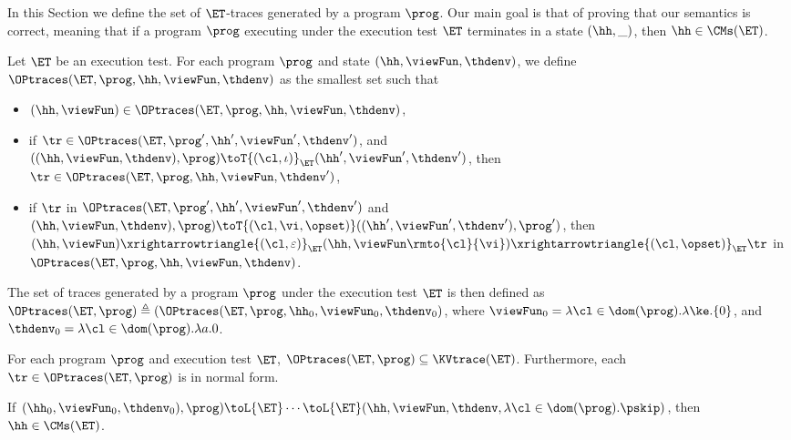 In this Section we define the set of $\ET$-traces generated by a program 
$\prog$. Our main goal is that of proving that our semantics is correct, 
meaning that if a program $\prog$ executing under the execution 
test $\ET$ terminates in a state $(\hh, \_)$, then $\hh \in \CMs(\ET)$. 

\begin{definition}
Let $\ET$ be an execution test. For each program $\prog$ and state 
$(\hh, \viewFun, \thdenv)$, we define $\OPtraces(\ET, \prog, \hh, \viewFun, \thdenv)$ 
as the smallest set such that 
\begin{itemize}
\item $(\hh, \viewFun) \in \OPtraces(\ET, \prog, \hh, \viewFun, \thdenv)$, 
\item if $\tr \in \OPtraces(\ET, \prog', \hh', \viewFun',\thdenv')$, 
and $((\hh, \viewFun, \thdenv) , \prog) \toT{(\cl, \iota)}_{\ET} (\hh', \viewFun', \thdenv')$, 
then $\tr \in \OPtraces(\ET, \prog, \hh, \viewFun, \thdenv')$, 
\item if $\tr$ in $\OPtraces(\ET, \prog', \hh', \viewFun', \thdenv')$ and 
\newline $(\hh, \viewFun, \thdenv), \prog) \toT{(\cl, \vi, \opset)} ((\hh', \viewFun', \thdenv'), \prog')$,  
then $(\hh, \viewFun) \xrightarrowtriangle{(\cl, \varepsilon)}_{\ET} (\hh, \viewFun\rmto{\cl}{\vi}) 
\xrightarrowtriangle{(\cl, \opset)}_{\ET} \tr$ in $\OPtraces(\ET, \prog, \hh, \viewFun, \thdenv)$. 
\end{itemize}

The set of traces generated by a program $\prog$ under the execution test $\ET$ is 
then defined as $\OPtraces(\ET, \prog) \triangleq (\OPtraces(\ET, \prog, \hh_{0}, \viewFun_{0}, 
\thdenv_{0})$, where $\viewFun_{0} = \lambda \cl \in \dom(\prog).\lambda \ke.\{0\}$, and 
$\thdenv_{0} = \lambda \cl \in \dom(\prog).\lambda a.0$.

\end{definition}

\begin{proposition}
For each program $\prog$ and execution test $\ET$, 
$\OPtraces(\ET, \prog) \subseteq \KVtrace(\ET)$. 
Furthermore, each $\tr \in \OPtraces(\ET, \prog)$ is in normal form. 
\end{proposition}

\begin{corollary}
If $(\hh_{0}, \viewFun_{0}, \thdenv_{0}), \prog) \toL{\ET} \cdots \toL{\ET} 
(\hh, \viewFun, \thdenv, \lambda \cl \in \dom(\prog). \pskip)$, then $\hh \in \CMs(\ET)$.
\end{corollary}


